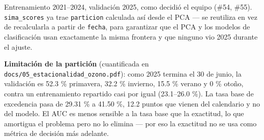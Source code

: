 \documentclass[
  spanish,
  letterpaper,
  DIV=11,
  numbers=noendperiod]{scrartcl}
\newenvironment{Shaded}{\begin{snugshade}}{\end{snugshade}}
\newcommand{\AttributeTok}[1]{\textcolor[rgb]{0.40,0.45,0.13}{#1}}
\newcommand{\CommentTok}[1]{\textcolor[rgb]{0.37,0.37,0.37}{#1}}
\newcommand{\ConstantTok}[1]{\textcolor[rgb]{0.56,0.35,0.01}{#1}}
\newcommand{\FunctionTok}[1]{\textcolor[rgb]{0.28,0.35,0.67}{#1}}
\newcommand{\NormalTok}[1]{\textcolor[rgb]{0.00,0.23,0.31}{#1}}
\newcommand{\OtherTok}[1]{\textcolor[rgb]{0.00,0.23,0.31}{#1}}
\newcommand{\SpecialCharTok}[1]{\textcolor[rgb]{0.37,0.37,0.37}{#1}}
\newcommand{\StringTok}[1]{\textcolor[rgb]{0.13,0.47,0.30}{#1}}
\begin{document}
Entrenamiento 2021--2024, validación 2025, como decidió el equipo (\#54,
\#55). \texttt{sima\_scores} ya trae \texttt{particion} calculada así
desde el PCA --- se reutiliza en vez de recalcularla a partir de
\texttt{fecha}, para garantizar que el PCA y los modelos de
clasificación usan exactamente la misma frontera y que ninguno vio 2025
durante el ajuste.

\begin{Shaded}
\end{Shaded}

\textbf{Limitación de la partición} (cuantificada en
\texttt{docs/05\_estacionalidad\_ozono.pdf}): como 2025 termina el 30 de
junio, la validación es 52.3 \% primavera, 32.2 \% invierno, 15.5 \%
verano y 0 \% otoño, contra un entrenamiento repartido casi por igual
(23.1--26.0 \%). La tasa base de excedencia pasa de 29.31 \% a 41.50 \%,
12.2 puntos que vienen del calendario y no del modelo. El AUC es menos
sensible a la tasa base que la exactitud, lo que amortigua el problema
pero no lo elimina --- por eso la exactitud no se usa como métrica de
decisión más adelante.

\begin{Shaded}
\end{Shaded}
\end{document}
